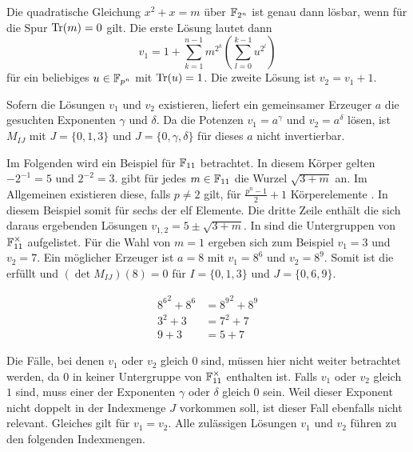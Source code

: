 \begin{lemma}
    Die quadratische Gleichung $x^2 + x = m$ über $\field{2}[n]$ ist genau dann lösbar, wenn für die Spur $\mathrm{Tr}(m) = 0$ gilt. Die erste Lösung lautet dann
    \begin{equation*}
        v_1 = 1 + \sum_{k=1}^{n-1} m^{2^k}(\sum_{l=0}^{k-1} u^{2^l})
    \end{equation*}
    für ein beliebiges $u \in \field{p}[n]$ mit $\mathrm{Tr}(u) = 1$. Die zweite Lösung ist $v_2 = v_1 + 1$.
\end{lemma}

Sofern die Lösungen $v_1$ und $v_2$ existieren, liefert ein gemeinsamer Erzeuger $a$ die gesuchten Exponenten $\gamma$ und $\delta$. Da die Potenzen $v_1 = a^\gamma$ und $v_2 = a^\delta$  lösen, ist $M_{IJ}$ mit $J = \{0,1,3\}$ und $J = \{0,\gamma,\delta\}$ für dieses $a$ nicht invertierbar.

\sloppy Im Folgenden wird ein Beispiel für $\field{11}$ betrachtet. In diesem Körper gelten ${-2^{-1} = 5}$ und $2^{-2} = 3$.  gibt für jedes $m \in \field{11}$ die Wurzel $\sqrt{3 + m}$ an. Im Allgemeinen existieren diese, falls $p \neq 2$ gilt, für $\frac{p^n-1}{2} + 1$ Körperelemente \cite{RootsFiniteFields}. In diesem Beispiel somit für sechs der elf Elemente. Die dritte Zeile enthält die sich daraus ergebenden Lösungen $v_{1,2} = 5 \pm \sqrt{3+m}$.
In  sind die Untergruppen von $\field{11}^\times$ aufgelistet. Für die Wahl von $m=1$ ergeben sich zum Beispiel $v_1 = 3$ und $v_2 = 7$. Ein möglicher Erzeuger ist $a = 8$ mit $v_1 = 8^6$ und $v_2 = 8^9$. Somit ist die  erfüllt und $(\det M_{IJ})(8) = 0$ für $I = \{0,1,3\}$ und $J = \{0,6,9\}$.

\begin{align*}
    {8^6}^2 + 8^6 &= {8^{9}}^2 + 8^9 \\
    3^2 + 3 &= 7^2 + 7 \\
    9 + 3 &= 5 + 7
\end{align*}

Die Fälle, bei denen $v_1$ oder $v_2$ gleich 0 sind, müssen hier nicht weiter betrachtet werden, da $0$ in keiner Untergruppe von $\field{11}^\times$ enthalten ist. Falls $v_1$ oder $v_2$ gleich $1$ sind, muss einer der Exponenten $\gamma$ oder $\delta$ gleich $0$ sein. Weil dieser Exponent nicht doppelt in der Indexmenge $J$ vorkommen soll, ist dieser Fall ebenfalls nicht relevant. Gleiches gilt für $v_1 = v_2$. Alle zulässigen Lösungen $v_1$ und $v_2$ führen zu den folgenden Indexmengen.

